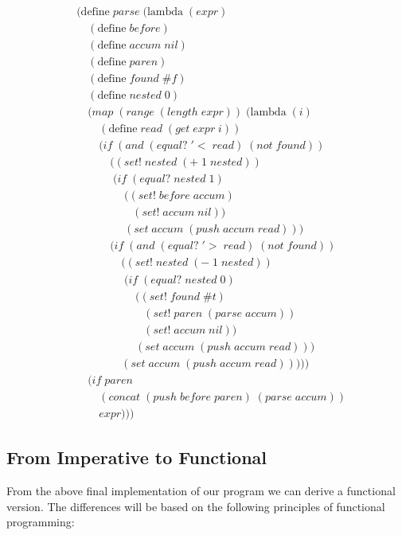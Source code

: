 \begin{align*}
& (\text{define} \; parse \; (\text{lambda} \; (expr) \; 
\\& \quad (\text{define} \; before)
\\& \quad (\text{define} \; accum \; nil)
\\& \quad (\text{define} \; paren)
\\& \quad (\text{define} \; found \; \#f)
\\& \quad (\text{define} \; nested \; 0)
\\& \quad (map \; (range \; (length \; expr)) \; (\text{lambda} \; (i)
\\& \qquad (\text{define} \; read \; (get \; expr \; i))
\\& \qquad (if \; (and \; (equal? \; '< \; read) \; (not \; found))
\\& \qquad \quad ((set! \; nested \; (+ \; 1 \; nested))
\\& \qquad \quad \; (if \; (equal? \; nested \; 1)
\\& \qquad \qquad \; ((set! \; before \; accum)
\\& \qquad \qquad \quad (set! \; accum \; nil))
\\& \qquad \qquad \; (set \; accum \; (push \; accum \; read)))
\\& \qquad \quad (if \; (and \; (equal? \; '> \; read) \; (not \; found))
\\& \qquad \qquad ((set! \; nested \; (- \; 1 \; nested))
\\& \qquad \qquad \; (if \; (equal? \; nested \; 0)
\\& \qquad \qquad \quad \; ((set! \; found \; \#t)
\\& \qquad \qquad \qquad (set! \; paren \; (parse \; accum))
\\& \qquad \qquad \qquad (set! \; accum \; nil))
\\& \qquad \qquad \quad \; (set \; accum \; (push \; accum \; read)))
\\& \qquad \qquad (set \; accum \; (push \; accum \; read)))))
\\& \quad (if \; paren
\\& \qquad (concat \; (push \; before \; paren) \; (parse \; accum))
\\& \qquad expr)))
\end{align*}

\subsection{From Imperative to Functional}
From the above final implementation of our program we can derive a functional 
version. The differences will be based on the following principles of functional 
programming:

